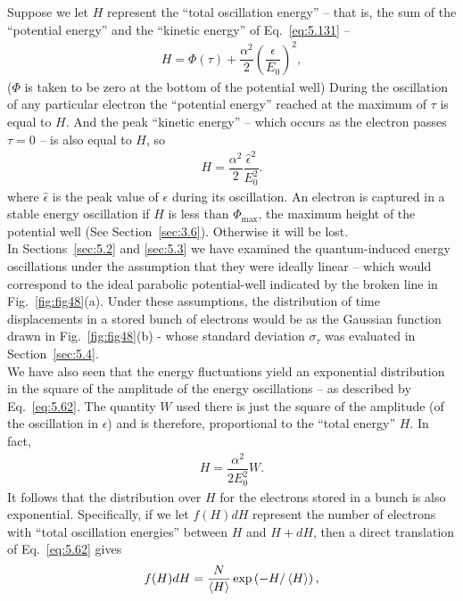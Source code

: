Suppose we let $H$ represent the ``total oscillation energy'' -- that is, the sum of the ``potential
 energy'' and the ``kinetic energy'' of Eq.~\eqref{eq:5.131} --
\begin{align}
	H = \Phi(\tau) + \dfrac{\alpha^2}{2} \left( \dfrac{\epsilon}{E_0} \right)^2,
\end{align}
($\Phi$ is taken to be zero at the bottom of the potential well) During the oscillation of any particular electron the ``potential energy'' reached at the maximum of $\tau$ is equal to $H$. And the peak ``kinetic energy'' -- which occurs as the electron passes $\tau = 0$ -- is also equal to %
$H$, so
\begin{align}
	H = \dfrac{\alpha^2}{2} \dfrac{\hat{\epsilon}^2}{E_0^2}.
\end{align}
where $\hat{\epsilon}$ is the peak value of $\epsilon$ during its oscillation. An electron is captured in a stable energy oscillation if $H$ is less than $\Phi_\text{max}$, the maximum height of the potential well (See Section~\ref{sec:3.6}). Otherwise it will be lost.\\
In Sections~\ref{sec:5.2} and \ref{sec:5.3} we have examined the quantum-induced energy oscillations under the assumption that they were ideally linear -- which would correspond to the ideal parabolic potential-well indicated by the broken line in Fig.~\ref{fig:fig48}(a). Under these assumptions, the distribution of time displacements in a stored bunch of electrons would be as the Gaussian function drawn in Fig.~\ref{fig:fig48}(b) - whose standard deviation $\sigma_\tau$ was evaluated in Section~\ref{sec:5.4}.\\
We have also seen that the energy fluctuations yield an exponential distribution in the square of the amplitude of the energy oscillations -- as described by Eq.~\eqref{eq:5.62}. The quantity $W$ used there is just the square of the amplitude (of the oscillation in $\epsilon$) and is therefore, proportional to the ``total energy'' $H$. In fact,
\begin{align}
	H = \dfrac{\alpha^2}{2 E_0^2}W.
\end{align}
It follows that the distribution over $H$ for the electrons stored in a bunch is also exponential. Specifically, if we let $f(H)dH$ represent the number of electrons with ``total oscillation energies'' between $H$ and $H + dH$, then a direct translation of Eq.~\eqref{eq:5.62} gives
\begin{align}
	f(H)dH = \dfrac{N}{\left< H \right>} \exp \left( -H/\left< H \right> \right),
\end{align}
